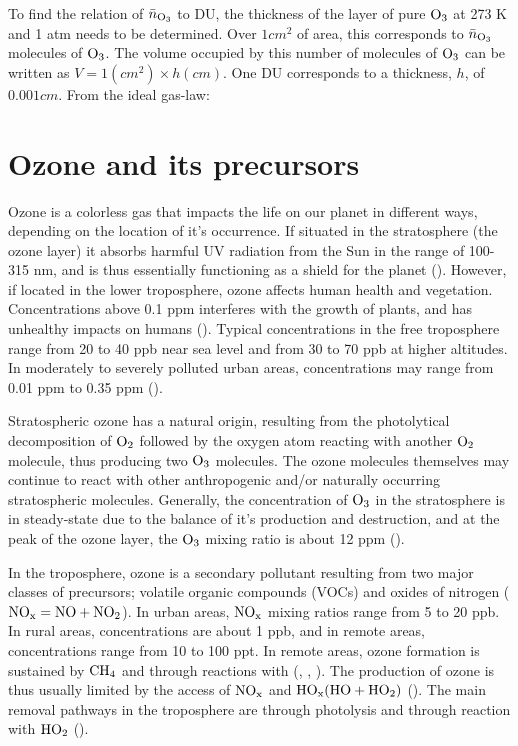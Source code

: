 To find the relation of $\bar{n}_{\mathrm{O_3}}$ to DU, the thickness of the layer of pure $\mathrm{O_3}$ at 273 K and 1 atm needs to be determined. Over $1 cm^2$ of area, this corresponds to $\bar{n}_{\mathrm{O_3}}$ molecules of $\mathrm{O_3}$. The volume occupied by this number of molecules of $\mathrm{O_3}$ can be written as $V = 1 (cm^2)\times h(cm)$. One DU corresponds to a thickness, $h$, of $0.001 cm$. From the ideal gas-law:




\section{Ozone and its precursors}\label{sec:ozone_and_precursors}

Ozone is a colorless gas that impacts the life on our planet in different ways, depending on the location of it's occurrence. If situated in the stratosphere (the ozone layer) it absorbs harmful UV radiation from the Sun in the range of 100-315 nm, and is thus essentially functioning as a shield for the planet (\cite{SeinfeldSpyros}). However, if located in the lower troposphere, ozone affects human health and vegetation. Concentrations above 0.1 \acrfull{ppm} interferes with the growth of plants, and has unhealthy impacts on humans (\cite{AtmModFund}). Typical concentrations in the free troposphere range from 20 to 40 \acrfull{ppb} near sea level and from 30 to 70 ppb at higher altitudes. In moderately to severely polluted urban areas, concentrations may range from 0.01 ppm to 0.35 ppm (\cite{AtmModFund}).  

\medskip

Stratospheric ozone has a natural origin, resulting from the photolytical decomposition of $\mathrm{O_2}$ followed by the oxygen atom reacting with another $\mathrm{O_2}$ molecule, thus producing two $\mathrm{O_3}$ molecules. The ozone molecules themselves may continue to react with other anthropogenic and/or naturally occurring stratospheric molecules. Generally, the concentration of $\mathrm{O_3}$ in the stratosphere is in steady-state due to the balance of it's production and destruction, and at the peak of the ozone layer, the $\mathrm{O_3}$ mixing ratio is about 12 ppm (\cite{SeinfeldSpyros}).  

\medskip

In the troposphere, ozone is a secondary pollutant resulting from two major classes of precursors; volatile organic compounds (VOCs) and oxides of nitrogen ($\mathrm{NO_x} = \mathrm{NO} + \mathrm{NO_2}$). In urban areas, $\mathrm{NO_x}$ mixing ratios range from 5 to 20 ppb. In rural areas, concentrations are about 1 ppb, and in remote areas, concentrations range from 10 to 100 ppt. In remote areas, ozone formation is sustained by $\mathrm{CH_4}$ and  through reactions with  (\cite{Cadle1970}, \cite{Levy1971}, \cite{SeinfeldSpyros}). The production of ozone is thus usually limited by the access of $\mathrm{NO_x}$ and $\mathrm{HO_x} (\mathrm{HO} + \mathrm{HO_2})$ (\cite{Levy1971}). The main removal pathways in the troposphere are through photolysis and through reaction with $\mathrm{HO_2}$ (\cite{SeinfeldSpyros}).

